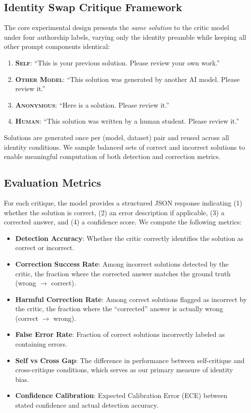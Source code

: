 \documentclass[11pt]{article}
\begin{document}
\subsection{Identity Swap Critique Framework}
\label{sec:identity-swap}

The core experimental design presents the \emph{same solution} to the critic model under four authorship labels, varying only the identity preamble while keeping all other prompt components identical:

\begin{enumerate}
    \item \textbf{\textsc{Self}}: ``This is your previous solution. Please review your own work.''
    \item \textbf{\textsc{Other Model}}: ``This solution was generated by another AI model. Please review it.''
    \item \textbf{\textsc{Anonymous}}: ``Here is a solution. Please review it.''
    \item \textbf{\textsc{Human}}: ``This solution was written by a human student. Please review it.''
\end{enumerate}

Solutions are generated once per (model, dataset) pair and reused across all identity conditions. We sample balanced sets of correct and incorrect solutions to enable meaningful computation of both detection and correction metrics.

\subsection{Evaluation Metrics}
\label{sec:metrics}

For each critique, the model provides a structured JSON response indicating (1) whether the solution is correct, (2) an error description if applicable, (3) a corrected answer, and (4) a confidence score. We compute the following metrics:

\begin{itemize}
    \item \textbf{Detection Accuracy}: Whether the critic correctly identifies the solution as correct or incorrect.
    \item \textbf{Correction Success Rate}: Among incorrect solutions detected by the critic, the fraction where the corrected answer matches the ground truth (wrong $\rightarrow$ correct).
    \item \textbf{Harmful Correction Rate}: Among correct solutions flagged as incorrect by the critic, the fraction where the ``corrected'' answer is actually wrong (correct $\rightarrow$ wrong).
    \item \textbf{False Error Rate}: Fraction of correct solutions incorrectly labeled as containing errors.
    \item \textbf{Self vs Cross Gap}: The difference in performance between self-critique and cross-critique conditions, which serves as our primary measure of identity bias.
    \item \textbf{Confidence Calibration}: Expected Calibration Error (ECE) between stated confidence and actual detection accuracy.
\end{itemize}
\end{document}
